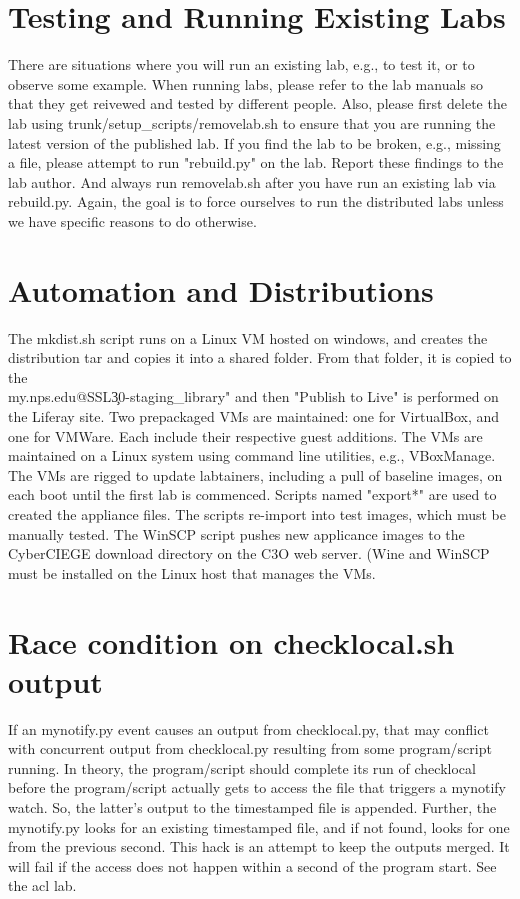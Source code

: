 \section{Testing and Running Existing Labs}
There are situations where you will run an existing lab, e.g., to test it, or to 
observe some example.  When running labs, please refer to the lab manuals
so that they get reivewed and tested by different people.  Also, please first delete
the lab using trunk/setup\_scripts/removelab.sh to ensure that you are running the latest
version of the published lab.  If you find the lab to be broken, e.g., missing a file, please
attempt to run "rebuild.py" on the lab.  Report these findings to the lab author.  And always
run removelab.sh after you have run an existing lab via rebuild.py.  Again, the goal is to
force ourselves to run the distributed labs unless we have specific reasons to do otherwise.


\section{Automation and Distributions}
The mkdist.sh script runs on a Linux VM hosted on windows, and creates the distribution tar 
and copies it into a shared folder.  From that folder, it is copied to the 
\\my.nps.edu@SSL\DavWWWRoot\webdav\c30-staging\document\_library" and then "Publish to Live" is 
performed on the Liferay site.
Two prepackaged VMs are maintained: one for VirtualBox, and one for VMWare.  Each include
their respective guest additions.  The VMs are maintained on a Linux system using command line
utilities, e.g., VBoxManage.  The VMs are rigged to update labtainers, including a pull of
baseline images, on each boot until the first lab is commenced.  Scripts named "export*" are
used to created the appliance files.  The scripts re-import into test images, which must be
manually tested.  The WinSCP script pushes new applicance images to the CyberCIEGE download
directory on the C3O web server.  (Wine and WinSCP must be installed on the Linux host that
manages the VMs.

\section {Race condition on checklocal.sh output}
If an mynotify.py event causes an output from checklocal.py, that may conflict with
concurrent output from checklocal.py resulting from some program/script running.  In 
theory, the program/script should complete its run of checklocal before the program/script
actually gets to access the file that triggers a mynotify watch.  So, the latter's output
to the timestamped file is appended.  Further, the mynotify.py looks for an existing timestamped
file, and if not found, looks for one from the previous second.  This hack is an attempt to
keep the outputs merged.  It will fail if the access does not happen within a second of the
program start.  See the acl lab.
